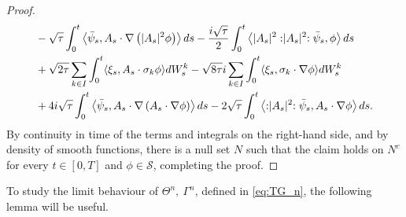 \documentclass[a4paper,10pt]{amsart}
\newcommand{\wick}[1]{:\mathrel{#1}:}
\theoremstyle{remark}
\numberwithin{equation}{section}
\begin{document}
\begin{proof}
\begin{align*}
     &  -\sqrt{\tau}\int_0^t\left\langle \bar{\psi}_s, A_s \cdot\nabla\left(|A_s|^2\phi\right)\right\rangle ds-\frac{i\sqrt{\tau}}{2}\int_0^t\left\langle |A_s|^2 \wick{|A_s|^2}\bar{\psi}_s, \phi\right\rangle ds \notag
     \\ &+\sqrt{2\tau}\sum_{k\in I }\int_0^t  \langle \xi_s, A_s\cdot \sigma_k \phi\rangle dW^k_s -\sqrt{8\tau}i\sum_{k\in I }\int_0^t  \langle \xi_s,  \sigma_k\cdot\nabla\phi\rangle dW^k_s\\ 
     &  +4i\sqrt{\tau}\int_0^t\left\langle  \bar{\psi}_s,A_s \cdot\nabla\left( A_s\cdot\nabla\phi\right)\right\rangle ds  -2\sqrt{\tau}\int_0^t\left\langle \wick{|A_s|^2}\bar{\psi}_s, A_s\cdot\nabla\phi\right\rangle ds. 
\end{align*}
  By continuity in time of the terms and integrals on the right-hand side,
  and by density of smooth functions, there is a null set $N$ such that the
  claim holds on $N^c$ for every $t\in[0,T]$ and
  $\phi\in\mathscr{S}$, completing the proof.
  \end{proof}
   To study the limit behaviour of $\Theta^n,\ \Gamma^n $, defined in \eqref{eq:TG_n}, the following lemma will be useful.
\end{document}
